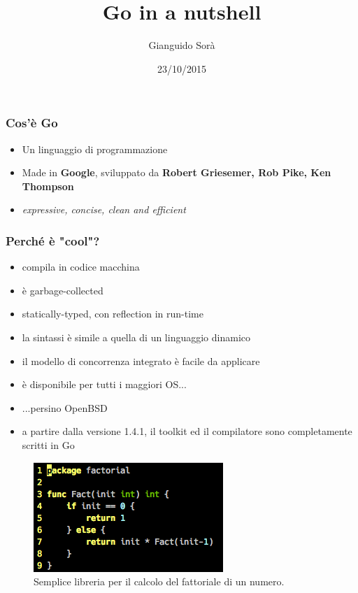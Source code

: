 \documentclass[12pt]{beamer}
\author{Gianguido Sorà}
\title{Go in a nutshell}
\institute{Università degli Studi di Salerno}
\date{23/10/2015}
\begin{document}
	\maketitle
	
	\begin{frame}
		\frametitle{Cos'è Go}
		\begin{itemize}[<+->]
			\item Un linguaggio di programmazione
			\item Made in \textbf{Google}, sviluppato da \textbf{Robert Griesemer, Rob Pike, Ken Thompson}
			\item \textit{expressive, concise, clean and efficient}
		\end{itemize}
	\end{frame}
	
	\begin{frame}
		\frametitle{Perché è "cool"?}
		\begin{itemize}[<+->]
			\item compila in codice macchina
			\item è garbage-collected
			\item statically-typed, con reflection in run-time
			\item la sintassi è simile a quella di un linguaggio dinamico
			\item il modello di concorrenza integrato è facile da applicare
			\item è disponibile per tutti i maggiori OS...
			\item ...persino OpenBSD
			\item a partire dalla versione 1.4.1, il toolkit ed il compilatore sono completamente scritti in Go
		\end{itemize}
	\end{frame}
	
	\begin{frame}
		\begin{figure}
			\centering
			\includegraphics[width=0.7\linewidth]{factlib}
			\caption[Calcolo fattoriale]{Semplice libreria per il calcolo del fattoriale di un numero.}
			\label{fig:Schermata2015-10-23alle01}
		\end{figure}
	\end{frame}
	
\end{document}
